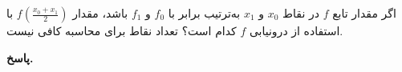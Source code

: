 اگر مقدار تابع 
\(f\)
در نقاط 
\(x_0\)
 و 
 \(x_1\)
 به‌ترتیب برابر با
 \(f_0\)
 و 
 \(f_1\)
 باشد، مقدار 
 \(f(\frac{x_0 + x_1}{2})\)
 با استفاده  از درونیابی 
 \(f\)
کدام است؟
          {تعداد نقاط برای محاسبه کافی نیست.}

\begin{answer}
	
	\textbf{پاسخ.}
	
\end{answer}
